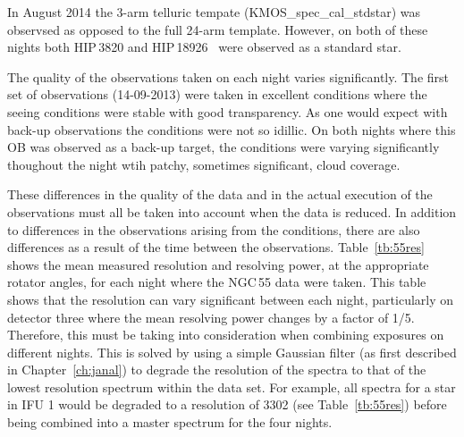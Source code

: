 In August 2014 the 3-arm telluric tempate (KMOS\_spec\_cal\_stdstar) was observsed as opposed to the full 24-arm template. However, on both of these nights both HIP\,3820 and HIP\,18926~\citep[B3\,V;][]{1988mcts.book.....H} were observed as a standard star.

The quality of the observations taken on each night varies significantly.
The first set of observations (14-09-2013) were taken in excellent conditions where the seeing conditions were stable with good transparency.
As one would expect with back-up observations the conditions were not so idillic.
On both nights where this OB was observed as a back-up target, the conditions were varying significantly thoughout the night wtih patchy, sometimes significant, cloud coverage.

These differences in the quality of the data and in the actual execution of the observations must all be taken into account when the data is reduced.
In addition to differences in the observations arising from the conditions, there are also differences as a result of the time between the observations.
Table~\ref{tb:55res} shows the mean measured resolution and resolving power, at the appropriate rotator angles, for each night where the NGC\,55 data were taken.
This table shows that the resolution can vary significant between each night, particularly on detector three where the mean resolving power changes by a factor of 1/5.
Therefore, this must be taking into consideration when combining exposures on different nights.
This is solved by using a simple Gaussian filter (as first described in Chapter~\ref{ch:janal}) to degrade the resolution of the spectra to that of the lowest resolution spectrum within the data set.
For example, all spectra for a star in IFU 1 would be degraded to a resolution of 3302 (see Table~\ref{tb:55res}) before being combined into a master spectrum for the four nights.

